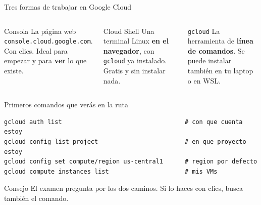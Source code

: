 \documentclass[aspectratio=169,10pt,c]{beamer}
\begin{document}
\begin{frame}[fragile]{Tres formas de trabajar en Google Cloud}
\begin{columns}[T,onlytextwidth]
\begin{block}{Consola}
\small La página web \texttt{console.cloud.google.com}. Con clics. Ideal para empezar y para \textbf{ver} lo que existe.
\end{block}
\begin{block}{Cloud Shell}
\small Una terminal Linux \textbf{en el navegador}, con \texttt{gcloud} ya instalado. Gratis y sin instalar nada.
\end{block}
\begin{block}{\texttt{gcloud}}
\small La herramienta de \textbf{línea de comandos}. Se puede instalar también en tu laptop o en WSL.
\end{block}
\end{columns}
\par\vspace{1mm}
\begin{exampleblock}{Primeros comandos que verás en la ruta}
\begin{lstlisting}[basicstyle=\ttfamily\footnotesize]
gcloud auth list                                  # con que cuenta estoy
gcloud config list project                        # en que proyecto estoy
gcloud config set compute/region us-central1      # region por defecto
gcloud compute instances list                     # mis VMs
\end{lstlisting}
\end{exampleblock}
\begin{alertblock}{Consejo}
\small El examen pregunta por los dos caminos. Si lo haces con clics, busca también el comando.
\end{alertblock}
\end{frame}
\end{document}
